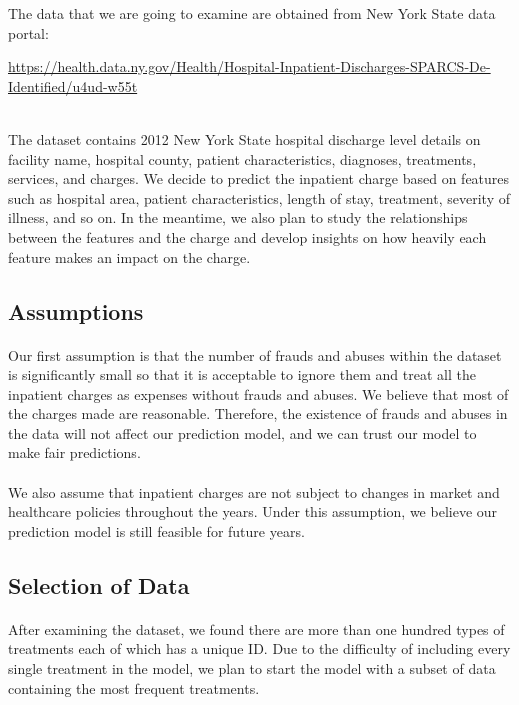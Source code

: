 \documentclass[9pt]{article}
\begin{document}
The data that we are going to examine are obtained from New York State data portal:\\
\centerline{\href{url}{https://health.data.ny.gov/Health/Hospital-Inpatient-Discharges-SPARCS-De-Identified/u4ud-w55t}}\\
 \hspace*{0.90cm}The dataset contains 2012 New York State hospital discharge level details on facility name, hospital county, patient characteristics, diagnoses, treatments, services, and charges. We decide to predict the inpatient charge based on features such as hospital area, patient characteristics, length of stay, treatment, severity of illness, and so on. In the meantime, we also plan to study the relationships between the features and the charge and develop insights on how heavily each feature makes an impact on the charge.

\subsection{Assumptions}

\paragraph{}

Our first assumption is that the number of frauds and abuses within the dataset is significantly small so that it is acceptable to ignore them and treat all the inpatient charges as expenses without frauds and abuses. We believe that most of the charges made are reasonable. Therefore, the existence of frauds and abuses in the data will not affect our prediction model, and we can trust our model to make fair predictions.

\paragraph{}

We also assume that inpatient charges are not subject to changes in market and healthcare policies throughout the years. Under this assumption, we believe our prediction model is still feasible for future years.

\subsection{Selection of Data}

\paragraph{}

After examining the dataset, we found there are more than one hundred types of treatments each of which has a unique ID. Due to the difficulty of including every single treatment in the model, we plan to start the model with a subset of data containing the most frequent treatments.
    
\end{document}
